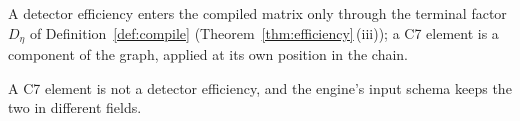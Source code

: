 
A detector efficiency enters the compiled matrix only through the terminal
factor $D_\eta$ of Definition~\ref{def:compile}
(Theorem~\ref{thm:efficiency}\,(iii)); a C7 element is a component of the graph,
applied at its own position in the chain.

\begin{requirement}\label{req:efficiency-schema}
A C7 element is not a detector efficiency, and the engine's input schema keeps
the two in different fields.
\end{requirement}

